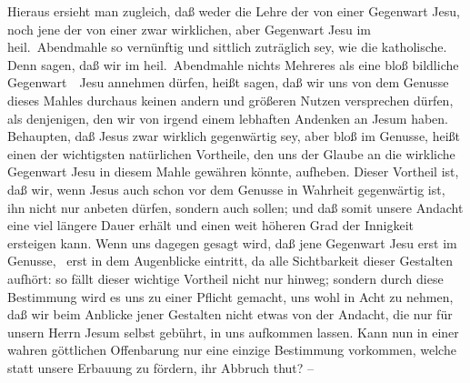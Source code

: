 \begin{RWanm} 
Hieraus ersieht man zugleich, daß weder die Lehre der  von einer  Gegenwart Jesu, noch jene der  von einer zwar wirklichen, aber  Gegenwart Jesu im heil.\ Abendmahle so vernünftig und sittlich zuträglich sey, wie die katholische. Denn sagen, daß wir im heil.\ Abendmahle nichts Mehreres als eine bloß bildliche Gegenwart~\ Jesu annehmen dürfen, heißt sagen, daß wir uns von dem Genusse dieses Mahles durchaus keinen andern und größeren Nutzen versprechen dürfen, als denjenigen, den wir von irgend einem lebhaften Andenken an Jesum haben. Behaupten, daß Jesus zwar wirklich gegenwärtig sey, aber bloß im Genusse, heißt einen der wichtigsten natürlichen Vortheile, den uns der Glaube an die wirkliche Gegenwart Jesu in diesem Mahle gewähren könnte, aufheben. Dieser Vortheil ist, daß wir, wenn Jesus auch schon vor dem Genusse in Wahrheit gegenwärtig ist, ihn nicht nur anbeten dürfen, sondern auch sollen; und daß somit unsere Andacht eine viel längere Dauer erhält und einen weit höheren Grad der Innigkeit ersteigen kann. Wenn uns dagegen gesagt wird, daß jene Gegenwart Jesu erst im Genusse, \dh\  erst in dem Augenblicke eintritt, da alle Sichtbarkeit dieser Gestalten aufhört: so fällt dieser wichtige Vortheil nicht nur hinweg; sondern durch diese Bestimmung wird es uns  zu einer Pflicht gemacht, uns wohl in Acht zu nehmen, daß wir beim Anblicke jener Gestalten nicht etwas von der Andacht, die nur für unsern Herrn Jesum selbst gebührt, in uns aufkommen lassen. Kann nun in einer wahren göttlichen Offenbarung nur eine einzige Bestimmung vorkommen, welche statt unsere Erbauung zu fördern, ihr Abbruch thut? -- 
\end{RWanm}
